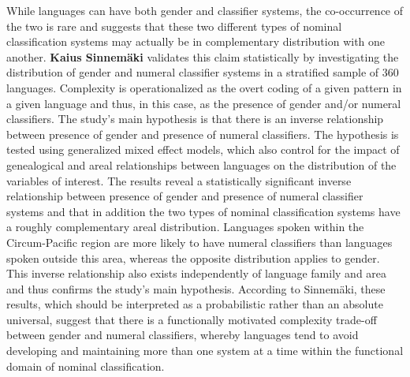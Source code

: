 \documentclass[output=collectionpaper]{langsci/langscibook}
\begin{document}
While languages can have both gender and classifier systems, the co-occurrence of the two is rare and suggests that these two different types of nominal classification systems may actually be in complementary distribution with one another. \textbf{Kaius Sinnemäki} validates this claim statistically by investigating the distribution of gender and numeral classifier systems in a stratified sample of 360 languages. Complexity is operationalized as the overt coding of a given pattern in a given language and thus, in this case, as the presence of gender and/or numeral classifiers. The study’s main hypothesis is that there is an inverse relationship between presence of gender and presence of numeral classifiers. The hypothesis is tested using generalized mixed effect models, which also control for the impact of genealogical and areal relationships between languages on the distribution of the variables of interest. The results reveal a statistically significant inverse relationship between presence of gender and presence of numeral classifier systems and that in addition the two types of nominal classification systems have a roughly complementary areal distribution. Languages spoken within the Circum-Pacific region are more likely to have numeral classifiers than languages spoken outside this area, whereas the opposite distribution applies to gender. This inverse relationship also exists independently of language family and area and thus confirms the study’s main hypothesis. According to Sinnemäki, these results, which should be interpreted as a probabilistic rather than an absolute universal, suggest that there is a functionally motivated complexity trade-off between gender and numeral classifiers, whereby languages tend to avoid developing and maintaining more than one system at a time within the functional domain of nominal classification.
\end{document}
